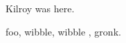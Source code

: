 \documentclass{article}
\begin{document}
  Kilroy was here.

  foo, wibble, wibble \cite{wibble}, gronk.
  \printbibliography
\end{document}
